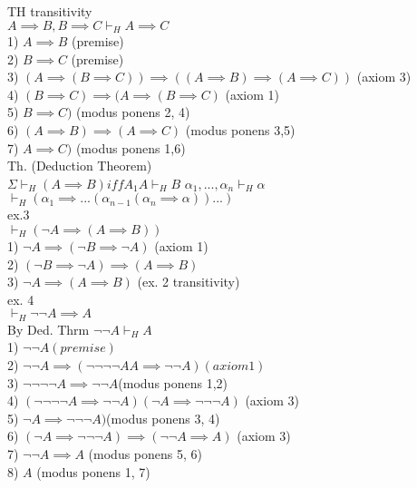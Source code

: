 \documentclass[12pt,oneside,notitlepage]{book}
\theoremstyle{definition}
\begin{document}
TH transitivity \\
${ A \implies B, B \implies C} \vdash_H A \implies C$ \\
1) $A \implies B$ (premise) \\ 
2) $B \implies C$ (premise) \\
3) $( A \implies (B \implies C)) \implies (( A \implies B) \implies (A \implies C))$ (axiom 3) \\
4) $(B \implies C) \implies (A \implies (B \implies C)$ (axiom 1) \\
5) $B \implies C)$ (modus ponens 2, 4) \\
6) $(A \implies B) \implies (A \implies C)$ (modus ponens 3,5) \\
7) $A \implies C)$ (modus ponens 1,6) \\

Th. (Deduction Theorem) \\
$\Sigma \vdash_H (A \implies B) iff A_1 A \vdash_H B$
${\alpha_1,...,\alpha_n} \vdash_H \alpha $ \\
$\vdash_H (\alpha_1 \implies ...(\alpha_{n-1}(\alpha_n \implies \alpha))...)$ \\

ex.3 \\
$\vdash_H (\neg A \implies (A \implies B))$ \\
1) $\neg A \implies (\neg B \implies \neg A)$ (axiom 1) \\
2) $(\neg B \implies \neg A) \implies (A \implies B)$ \\
3) $\neg A \implies ( A \implies B)$ (ex. 2 transitivity) \\

ex. 4 \\
$\vdash_H \neg\neg A \implies A$ \\
By Ded. Thrm $\neg \neg A \vdash_H A$ \\

1) $\neg \neg A (premise)$ \\
2) $\neg \neg A \implies (\neg \neg \neg \neg A A \implies  \neg \neg A) (axiom 1)$ \\
3) $\neg \neg \neg \neg A \implies \neg \neg A $(modus ponens 1,2) \\
4) $( \neg \neg \neg \neg A \implies \neg \neg A) (\neg A \implies \neg \neg \neg A)$ (axiom 3) \\
5) $\neg A \implies \neg \neg \neg A) $(modus ponens 3, 4) \\
6) $(\neg A \implies \neg \neg \neg A) \implies ( \neg \neg A \implies A)$ (axiom 3) \\
7) $\neg \neg A \implies A$ (modus ponens 5, 6) \\
8) $A$ (modus ponens 1, 7) \\
\end{document}

